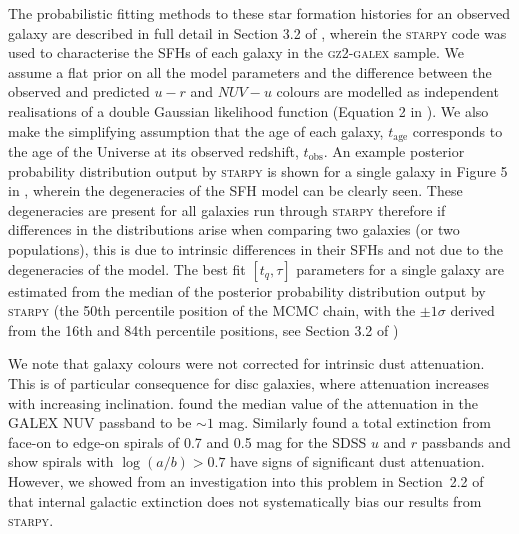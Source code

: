 \documentclass[useAMS,usenatbib]{mn2e}
\begin{document}

The probabilistic fitting methods to these star formation histories for an observed galaxy are described in full detail in Section 3.2 of \cite{smethurst15}, wherein the \textsc{starpy} code was used to characterise the SFHs of each galaxy in the \textsc{gz2-galex} sample. We assume a flat prior on all the model parameters and the difference between the observed and predicted $u-r$ and $NUV-u$ colours are modelled as independent realisations of a double Gaussian likelihood function (Equation 2 in \citealt{smethurst15}). We also make the simplifying assumption that the age of each galaxy, $t_\mathrm{age}$ corresponds to the age of the Universe at its observed redshift, $t_\mathrm{obs}$. An example posterior probability distribution output by \textsc{starpy} is shown for a single galaxy in Figure 5 in \cite{smethurst15}, wherein the degeneracies of the SFH model can be clearly seen. These degeneracies are present for all galaxies run through \textsc{starpy} therefore if differences in the distributions arise when comparing two galaxies (or two populations), this is due to intrinsic differences in their SFHs and not due to the degeneracies of the model. The best fit $[t_q, \tau]$ parameters for a single galaxy are estimated from the median of the posterior probability distribution output by \textsc{starpy} (the 50th percentile position of the MCMC chain, with the $\pm1\sigma$ derived from the 16th and 84th percentile positions, see Section 3.2 of \citealt{smethurst15})

We note that galaxy colours were not corrected for intrinsic dust attenuation. This is of particular consequence for disc galaxies, where attenuation increases with increasing inclination. \cite{Buat05} found the median value of the attenuation in the GALEX NUV passband to be $\sim 1$ mag. Similarly \cite{masters10c} found a total extinction from face-on to edge-on spirals of 0.7 and 0.5 mag for the SDSS $u$ and $r$ passbands and show spirals with $\log(a/b) > 0.7$ have signs of significant dust attenuation. However, we showed from an investigation into this problem in Section~2.2 of \citet{smethurst16} that internal galactic extinction does not systematically bias our results from \textsc{starpy}. 
\end{document}
